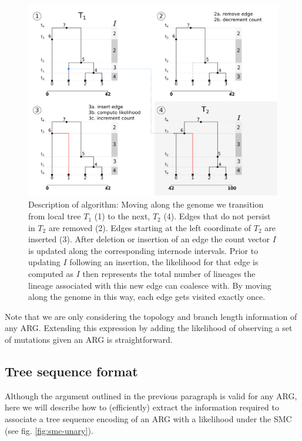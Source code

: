 \documentclass{article}
\begin{document}
\begin{figure}[!ht] \label{fig:algo}
\centering
\includegraphics[width=\textwidth]{figures/ts_algo_2rows.png}
\caption{Description of algorithm: Moving along the genome we transition from  
local tree $T_1$ (1) to the next, $T_2$ (4). Edges that do not persist in $T_2$ are 
removed (2). Edges starting at the left coordinate of $T_2$ are inserted (3). 
After deletion or insertion of an edge the count vector $I$ is updated along the 
corresponding internode intervals. Prior to updating $I$ following an insertion, 
the likelihood for that edge is computed as $I$ then represents the total number of 
lineages the lineage associated with this new edge can 
coalesce with. By moving along the genome in this way, each edge gets visited exactly once.}
\end{figure}

Note that we are only considering the topology and branch length information of any ARG. 
Extending this expression by adding the likelihood of observing a set of mutations 
given an ARG is straightforward.


\subsection{Tree sequence format} \label{par:algo}

Although the argument outlined in the previous paragraph is valid for any ARG, here we 
will describe how to (efficiently) extract the information required to associate a
tree sequence encoding of an ARG with a likelihood under the SMC (see fig. \ref{fig:smc-unary}).\\
\end{document}
